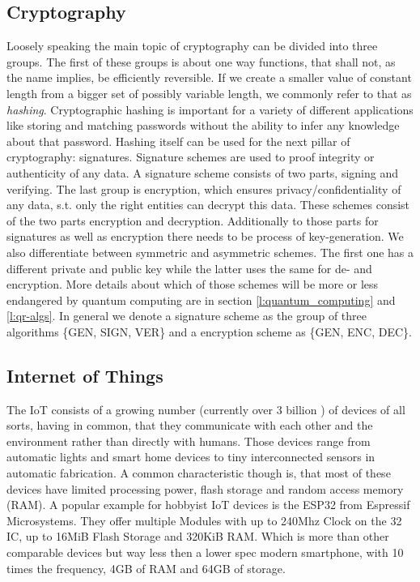 \documentclass[conference]{IEEEtran}
\newcommand{\comment}[1]{}
\begin{document}
\subsection{Cryptography}\label{bg:crypto}
Loosely speaking the main topic of cryptography can be divided into three groups.
The first of these groups is about one way functions, that shall not, as the name implies, be efficiently reversible.
If we create a smaller value of constant length from a bigger set of possibly variable length, we commonly refer to that as \textit{hashing}.
Cryptographic hashing is important for a variety of different applications like storing and matching passwords without the ability to infer any knowledge about that password.
Hashing itself can be used for the next pillar of cryptography: signatures.
Signature schemes are used to proof integrity or authenticity of any data.
A signature scheme consists of two parts, signing and verifying. 
The last group is encryption, which ensures privacy/confidentiality of any data, s.t. only the right entities can decrypt this data.
These schemes consist of the two parts encryption and decryption.
Additionally to those parts for signatures as well as encryption there needs to be process of key-generation.
We also differentiate between symmetric and asymmetric schemes. The first one has a different private and public key while the latter uses the same for de- and encryption.
More details about which of those schemes will be more or less endangered by quantum computing are in section \ref{l:quantum_computing} and \ref{l:qr-algs}.
\newline
In general we denote a signature scheme as the group of three algorithms \{GEN, SIGN, VER\} and a encryption scheme as \{GEN, ENC, DEC\}.

\subsection{Internet of Things}\label{bg:iot}
\comment{ %
} %

The IoT consists of a growing number (currently over 3 billion \cite{QR_IoT}) of devices of all sorts, having in common, that they communicate with each other and the environment rather than directly with humans.
Those devices range from automatic lights and smart home devices to tiny interconnected sensors in automatic fabrication.
A common characteristic though is, that most of these devices have limited processing power, flash storage and random access memory (RAM). 
A popular example for hobbyist IoT devices is the ESP32 from Espressif Microsystems.
They offer multiple Modules with up to 240Mhz Clock on the 32 IC, up to 16MiB Flash Storage and 320KiB RAM.
Which is more than other comparable devices but way less then a lower spec modern smartphone, with 10 times the frequency, 4GB of RAM and 64GB of storage.
\end{document}
